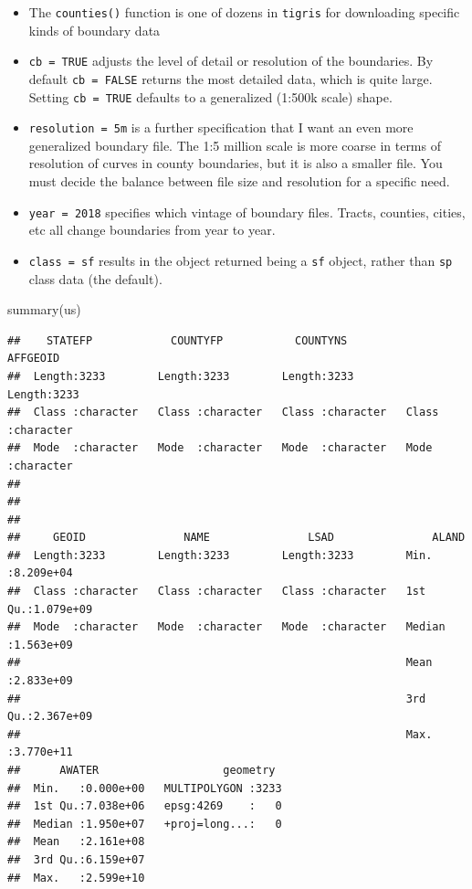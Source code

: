 \documentclass[
]{book}
\newenvironment{Shaded}{\begin{snugshade}}{\end{snugshade}}
\newcommand{\FunctionTok}[1]{\textcolor[rgb]{0.00,0.00,0.00}{#1}}
\newcommand{\NormalTok}[1]{#1}
\providecommand{\tightlist}{%
  \setlength{\itemsep}{0pt}\setlength{\parskip}{0pt}}
\begin{document}
\begin{itemize}
\tightlist
\item
  The \texttt{counties()} function is one of dozens in \texttt{tigris} for downloading specific kinds of boundary data
\item
  \texttt{cb\ =\ TRUE} adjusts the level of detail or resolution of the boundaries. By default \texttt{cb\ =\ FALSE} returns the most detailed data, which is quite large. Setting \texttt{cb\ =\ TRUE} defaults to a generalized (1:500k scale) shape.
\item
  \texttt{resolution\ =\ \textquotesingle{}5m\textquotesingle{}} is a further specification that I want an even more generalized boundary file. The 1:5 million scale is more coarse in terms of resolution of curves in county boundaries, but it is also a smaller file. You must decide the balance between file size and resolution for a specific need.
\item
  \texttt{year\ =\ 2018} specifies which vintage of boundary files. Tracts, counties, cities, etc all change boundaries from year to year.
\item
  \texttt{class\ =\ \textquotesingle{}sf\textquotesingle{}} results in the object returned being a \texttt{sf} object, rather than \texttt{sp} class data (the default).
\end{itemize}

\begin{Shaded}
\begin{Highlighting}[]
\FunctionTok{summary}\NormalTok{(us)}
\end{Highlighting}
\end{Shaded}

\begin{verbatim}
##    STATEFP            COUNTYFP           COUNTYNS           AFFGEOID        
##  Length:3233        Length:3233        Length:3233        Length:3233       
##  Class :character   Class :character   Class :character   Class :character  
##  Mode  :character   Mode  :character   Mode  :character   Mode  :character  
##                                                                             
##                                                                             
##                                                                             
##     GEOID               NAME               LSAD               ALAND          
##  Length:3233        Length:3233        Length:3233        Min.   :8.209e+04  
##  Class :character   Class :character   Class :character   1st Qu.:1.079e+09  
##  Mode  :character   Mode  :character   Mode  :character   Median :1.563e+09  
##                                                           Mean   :2.833e+09  
##                                                           3rd Qu.:2.367e+09  
##                                                           Max.   :3.770e+11  
##      AWATER                   geometry   
##  Min.   :0.000e+00   MULTIPOLYGON :3233  
##  1st Qu.:7.038e+06   epsg:4269    :   0  
##  Median :1.950e+07   +proj=long...:   0  
##  Mean   :2.161e+08                       
##  3rd Qu.:6.159e+07                       
##  Max.   :2.599e+10
\end{verbatim}
\end{document}
